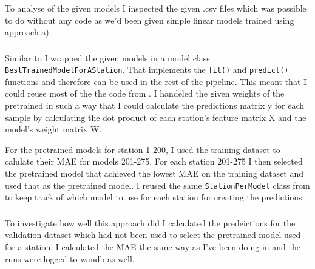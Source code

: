 \documentclass[a4paper]{article}
\begin{document}
    \subsubsection*{}
    To analyse of the given models I inspected the given .csv files which was possible to do without any code as we'd been given
    simple linear models trained using approach
    a).

    \subsubsection*{}

    Similar to  I wrapped the given models in a model class \texttt{BestTrainedModelForAStation}.
    That implements the \texttt{fit()} and \texttt{predict()} functions and therefore
    can be used in the rest of the pipeline. This meant that I could reuse most of the the code from .
    I handeled the given weights of the pretrained in such a way that
    I could calculate the predictions matrix y for each sample by calculating the dot product of each station's feature matrix X
    and the model's weight matrix W.

    For the pretrained models for station 1-200, I used the training dataset to calulate their MAE for models 201-275. For each
    station 201-275 I then selected the pretrained model that achieved
    the lowest MAE on the training dataset and used that as the pretrained model. I reused the same \texttt{StationPerModel}
    class from  to keep track of which model to use for each station for creating the predictions.

    \subsubsection*{}

    To investigate how well this approach
    did I calculated the predeictions for  the validation dataset which had not been used to select the pretrained model used for a station.
    I calculated the MAE the same way as I've been doing in  and the runs were logged to wandb as well.

    \subsection*{}
\end{document}
